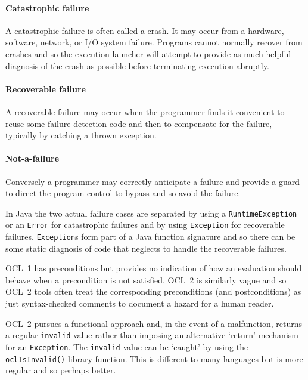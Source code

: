 \documentclass{jot}
\begin{document}
\paragraph{Catastrophic failure} A catastrophic failure is often called a crash. It may occur from a hardware, software, network, or I/O system failure. Programs cannot normally recover from crashes and so the execution launcher will attempt to provide as much helpful diagnosis of the crash as possible before terminating execution abruptly.

\paragraph{Recoverable failure} A recoverable failure may occur when the programmer finds it convenient to reuse some failure detection code and then to compensate for the failure, typically by catching a thrown exception.


\paragraph{Not-a-failure} Conversely a programmer may correctly anticipate a failure and provide a guard to direct the program control to bypass and so avoid the failure. 

In Java the two actual failure cases are separated by using a \verb$RuntimeException$ or an \verb$Error$ for catastrophic failures and by using \verb$Exception$ for recoverable failures. \verb$Exception$s form part of a Java function signature and so there can be some static diagnosis of code that neglects to handle the recoverable failures.

OCL~1 has preconditions but provides no indication of how an evaluation should behave when a precondition is not satisfied. OCL~2 is similarly vague and so OCL~2 tools often treat the corresponding preconditions (and postconditions) as just syntax-checked comments to document a hazard for a human reader.

OCL~2 pursues a functional approach and, in the event of a malfunction, returns a regular \verb$invalid$ value rather than imposing an alternative `return' mechanism for an \verb$Exception$. The \verb$invalid$ value can be `caught' by using the \verb$oclIsInvalid()$ library function. This is different to many languages but is more regular and so perhaps better.
\end{document}
